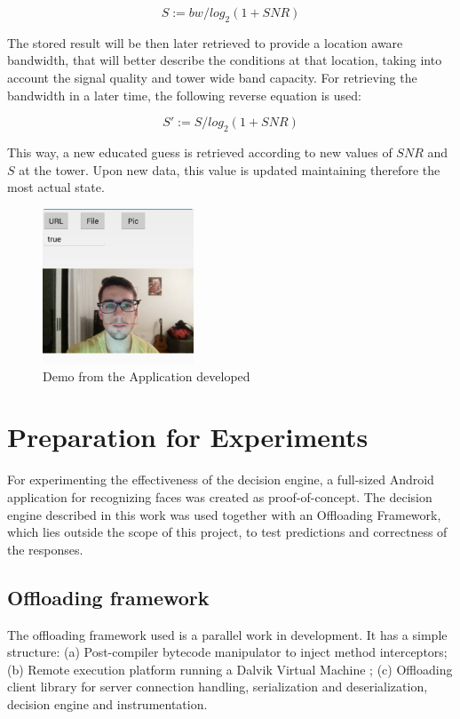 \documentclass[10pt, conference, letterpaper]{IEEEtran}
\begin{document}
  \begin{equation} \label{eq:shannonbw}
    S := bw / log_2(1 + SNR)
  \end{equation}

  The stored result will be then later retrieved to provide a location aware bandwidth, that will better describe the conditions at that location, taking into account the signal quality and tower wide band capacity. For retrieving the bandwidth in a later time, the following reverse equation is used:

  \begin{equation} \label{eq:shannonbw_reverse}
    S' := S / log_2(1 + SNR)
  \end{equation}

  This way, a new educated guess is retrieved according to new values of $SNR$ and $S$ at the tower. Upon new data, this value is updated maintaining therefore the most actual state.

\begin{figure}[!t]
  \centering
  \includegraphics[width=0.4\textwidth]{imgs/app.png}
  \caption{Demo from the Application developed}
  \label{fig:exectime}
\end{figure}

  \section{Preparation for Experiments}
  For experimenting the effectiveness of the decision engine, a full-sized Android application for recognizing faces was created as proof-of-concept. The decision engine described in this work was used together with an Offloading Framework, which lies outside the scope of this project, to test predictions and correctness of the responses.

  \subsection{Offloading framework}
  The offloading framework used is a parallel work in development. It has a simple structure: (a) Post-compiler bytecode manipulator to inject method interceptors; (b) Remote execution platform running a Dalvik Virtual Machine \cite{ehringer2010dalvik}; (c) Offloading client library for server connection handling, serialization and deserialization, decision engine and instrumentation.
\end{document}
